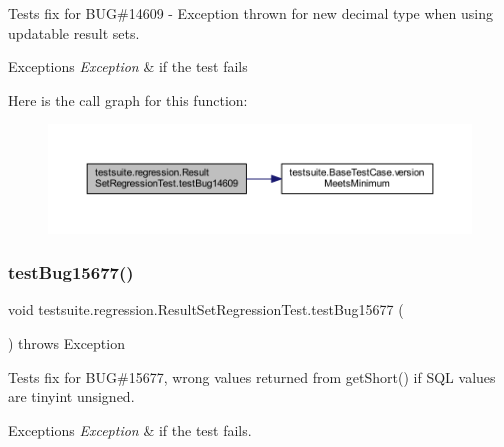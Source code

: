 Tests fix for B\+UG\#14609 -\/ Exception thrown for new decimal type when using updatable result sets.


\begin{DoxyExceptions}{Exceptions}
{\em Exception} & if the test fails \\
\hline
\end{DoxyExceptions}
Here is the call graph for this function\+:
\nopagebreak
\begin{figure}[H]
\begin{center}
\leavevmode
\includegraphics[width=350pt]{classtestsuite_1_1regression_1_1_result_set_regression_test_a7fc922fe83b42cb83638138be9f5ac4c_cgraph}
\end{center}
\end{figure}
\mbox{\label{classtestsuite_1_1regression_1_1_result_set_regression_test_af586d3a65d3b053faa5dd5da4cd5cb15}} 
\subsubsection{\texorpdfstring{test\+Bug15677()}{testBug15677()}}
{\footnotesize\ttfamily void testsuite.\+regression.\+Result\+Set\+Regression\+Test.\+test\+Bug15677 (\begin{DoxyParamCaption}{ }\end{DoxyParamCaption}) throws Exception}

Tests fix for B\+UG\#15677, wrong values returned from get\+Short() if S\+QL values are tinyint unsigned.


\begin{DoxyExceptions}{Exceptions}
{\em Exception} & if the test fails. \\
\hline
\end{DoxyExceptions}
\mbox{\label{classtestsuite_1_1regression_1_1_result_set_regression_test_afd1a4f6cb3b76fec4eed7cd2b0aa84ed}} 
